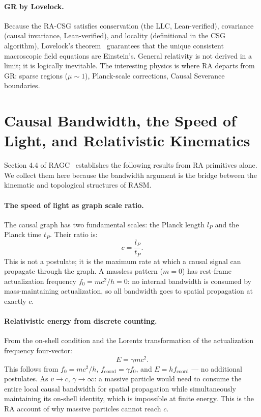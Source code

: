 \documentclass[11pt,a4paper]{article}
\begin{document}
\paragraph{GR by Lovelock.}
Because the RA-CSG satisfies conservation (the LLC, Lean-verified), covariance
(causal invariance, Lean-verified), and locality (definitional in the CSG
algorithm), Lovelock's theorem~\citep{Lovelock1971} guarantees that the unique
consistent macroscopic field equations are Einstein's. General relativity is
not derived in a limit; it is logically inevitable. The interesting physics
is where RA departs from GR: sparse regions ($\mu \sim 1$), Planck-scale
corrections, Causal Severance boundaries.

\section{Causal Bandwidth, the Speed of Light, and Relativistic Kinematics}
\label{sec:bandwidth}

Section 4.4 of RAGC~\citep{Sandeman2026RAGC} establishes the following results
from RA primitives alone. We collect them here because the bandwidth argument
is the bridge between the kinematic and topological structures of RASM.

\paragraph{The speed of light as graph scale ratio.}
The causal graph has two fundamental scales: the Planck length $l_P$ and the
Planck time $t_P$. Their ratio is:
\begin{equation}
  c = \frac{l_P}{t_P}.
  \label{eq:c_native}
\end{equation}
This is not a postulate; it is the maximum rate at which a causal signal can
propagate through the graph. A massless pattern ($m = 0$) has rest-frame
actualization frequency $f_0 = mc^2/h = 0$: no internal bandwidth is consumed
by mass-maintaining actualization, so all bandwidth goes to spatial propagation
at exactly $c$.

\paragraph{Relativistic energy from discrete counting.}
From the on-shell condition and the Lorentz transformation of the actualization
frequency four-vector:
\begin{equation}
  E = \gamma mc^2.
  \label{eq:rel_energy}
\end{equation}
This follows from $f_0 = mc^2/h$, $f_{\mathrm{coord}} = \gamma f_0$, and
$E = hf_{\mathrm{coord}}$ --- no additional postulates. As $v \to c$,
$\gamma \to \infty$: a massive particle would need to consume the entire local
causal bandwidth for spatial propagation while simultaneously maintaining its
on-shell identity, which is impossible at finite energy. This is the RA
account of why massive particles cannot reach $c$.
\end{document}
